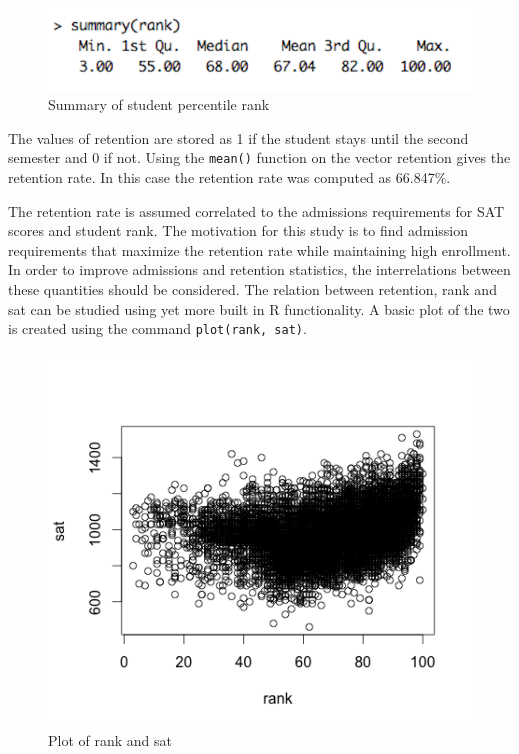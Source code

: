 \documentclass{article}
\begin{document}
\begin{figure}[H]
\begin{center}
\includegraphics[scale=0.4]{ranksum}
\end{center}
\caption{Summary of student percentile rank}
\end{figure}

The values of retention are stored as 1 if the student stays until the second semester and 0 if not. 
Using the \verb|mean()| function on the vector retention gives the retention rate. 
In this case the retention rate was computed as 66.847\%. 

The retention rate is assumed correlated to the admissions requirements for SAT scores and student rank. 
The motivation for this study is to find admission requirements that maximize the 
retention rate while maintaining high enrollment. 
In order to improve admissions and retention statistics, the interrelations between these quantities should be considered. 
The relation between retention, rank and sat can be studied using yet more built in R functionality. 
A basic plot of the two is created using the command \verb|plot(rank, sat)|.

\begin{figure}[H]
\begin{center}
\includegraphics[scale=0.5]{Rplot02}
\end{center}
\caption{Plot of rank and sat}
\end{figure}
\end{document}
